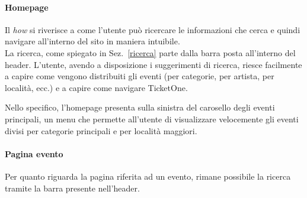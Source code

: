 	\paragraph{Homepage}
		Il \textit{how} si riverisce a come l'utente può ricercare le informazioni che cerca e quindi navigare all'interno del sito in maniera intuibile.\\
		La ricerca, come spiegato in Sez.~\ref{ricerca} parte dalla barra posta all'interno del header.
		L'utente, avendo a disposizione i suggerimenti di ricerca, riesce facilmente a capire come vengono distribuiti gli eventi (per categorie, per artista, per località, ecc.) e a capire come navigare TicketOne.
		\par Nello specifico, l'homepage presenta sulla sinistra del carosello degli eventi principali, un menu che permette all'utente di visualizzare velocemente gli eventi divisi per categorie principali e per località maggiori.
		
	\paragraph{Pagina evento}
		Per quanto riguarda la pagina riferita ad un evento, rimane possibile la ricerca tramite la barra presente nell'header.
		